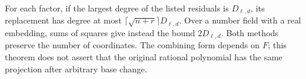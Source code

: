 \documentclass[11pt,a4paper]{article}
\theoremstyle{definition}
\theoremstyle{remark}
\begin{document}
For each factor, if the largest degree of the listed residuals is
$D_{\ell,d}$, its replacement has degree at most
$\lceil\sqrt{n+r}\rceil D_{\ell,d}$. Over a number field with
a real embedding, sums of squares give instead the bound
$2D_{\ell,d}$. Both methods preserve the number of coordinates.
The combining form depends on $F$; this
theorem does not assert that the original rational polynomial has
the same projection after arbitrary base change.
\end{document}
